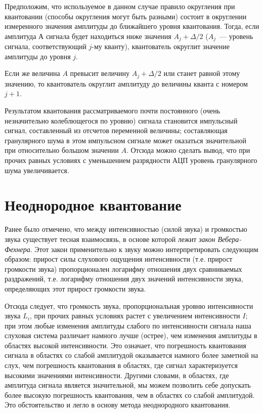 \documentclass[oneside, final, 14pt]{extreport}
\begin{document}
Предположим, что используемое в данном случае правило округления при квантовании (способы округления могут быть разными) состоит в округлении измеренного значения амплитуды до ближайшего уровня квантования. Тогда, если амплитуда $А$ сигнала будет находиться ниже значения $A_j+\Delta/2$ ($A_j$~--- уровень сигнала, соответствующий $j$-му кванту), квантователь округлит значение амплитуды до
уровня $j$. 

Если же величина $A$ превысит величину $A_j+\Delta/2$ или станет равной этому значению, то квантователь округлит амплитуду до величины кванта с номером $j+1$.

Результатом квантования рассматриваемого почти постоянного (очень незначительно колеблющегося по уровню) сигнала становится импульсный сигнал, составленный из отсчетов переменной величины; составляющая гранулярного шума в этом импульсном сигнале может оказаться значительной при относительно большом значении $A$. Отсюда можно сделать вывод, что при прочих равных условиях с уменьшением разрядности АЦП уровень гранулярного шума увеличивается.

\section{Неоднородное квантование}
Ранее было отмечено, что между интенсивностью (силой звука) и громкостью звука существует тесная взаимосвязь, в основе которой лежит \textit{закон Вебера-Фехнера}. Этот закон применительно к звуку можно интерпретировать следующим образом: прирост силы слухового ощущения интенсивности (т.е. прирост громкости звука) пропорционален логарифму отношения двух сравниваемых раздражений, т.е. логарифму отношения двух значений интенсивности звука, определяющих этот прирост громкости звука. 

Отсюда следует, что громкость звука, пропорциональная уровню интенсивности звука $L_i$, при прочих равных условиях растет с увеличением интенсивности $I$; при этом любые изменения амплитуды слабого по интенсивности сигнала наша слуховая система различает намного лучше (острее), чем изменения амплитуды в областях высокой интенсивности. Это означает, что погрешность квантования сигнала в областях со слабой амплитудой оказывается намного более заметной на слух, чем погрешность квантования в областях, где сигнал характеризуется высокими значениями интенсивности. Другими словами, в областях, где амплитуда сигнала является значительной, мы можем позволить себе допускать более высокую погрешность квантования, чем в областях со слабой амплитудой. Это обстоятельство и легло в основу метода неоднородного квантования.
\end{document}

